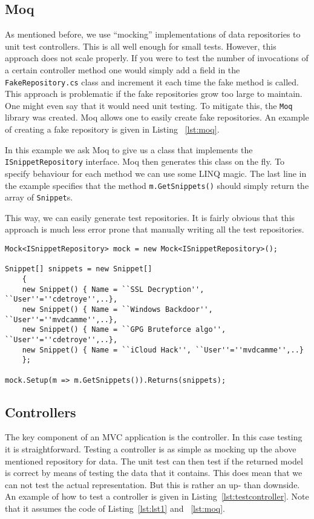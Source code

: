 \documentclass[10pt,a4paper,BCOR12mm, headexclude, footexclude,
  twoside, openright]{scrartcl}
\numberwithin{equation}{section} %
\numberwithin{figure}{section} %
\numberwithin{table}{section} %
\begin{document}
\subsection{Moq}
As mentioned before, we use ``mocking'' implementations of data repositories to
unit test controllers. This is all well enough for small tests. However, this
approach does not scale properly. If you were to test the number of invocations
of a certain controller method one would simply add a field in the
\texttt{FakeRepository.cs} class and increment it each time the fake method is
called. This approach is problematic if the fake repositories grow too large to
maintain. One might even say that it would need unit testing. To mitigate this,
the \texttt{Moq} library was created. Moq allows one to easily
create fake repositories. An example of creating a fake repository is given in
Listing ~\ref{lst:moq}.

In this example we ask Moq to give us a class that implements the
\texttt{ISnippetRepository} interface. Moq then generates this class on the
fly. To specify behaviour for each method we can use some LINQ magic. The last
line in the example specifies that the method \texttt{m.GetSnippets()} should
simply return the array of \texttt{Snippet}s.

This way, we can easily generate test repositories. It is fairly obvious that
this approach is much less error prone that manually writing all the test
repositories.

\begin{lstlisting}[caption={Creating a mocking repository using Moq.}, label={lst:moq}]
Mock<ISnippetRepository> mock = new Mock<ISnippetRepository>();

Snippet[] snippets = new Snippet[] 
	{
	new Snippet() { Name = ``SSL Decryption'', ``User''=''cdetroye'',..},
	new Snippet() { Name = ``Windows Backdoor'', ``User''=''mvdcamme'',..},
	new Snippet() { Name = ``GPG Bruteforce algo'', ``User''=''cdetroye'',..},
	new Snippet() { Name = ``iCloud Hack'', ``User''=''mvdcamme'',..}
	};

mock.Setup(m => m.GetSnippets()).Returns(snippets);
\end{lstlisting}

\subsection{Controllers}
The key component of an MVC application is the controller. In this case testing
it is straightforward. Testing a controller is as simple as mocking up the above
mentioned repository for data. The unit test can then test if the returned model
is correct by means of testing the data that it contains. This does mean that we
can not test the actual representation. But this is rather an up- than
downside. An example of how to test a controller is given in
Listing~\ref{lst:testcontroller}. Note that it assumes the code of
Listing~\ref{lst:lst1} and ~\ref{lst:moq}.
\end{document}
